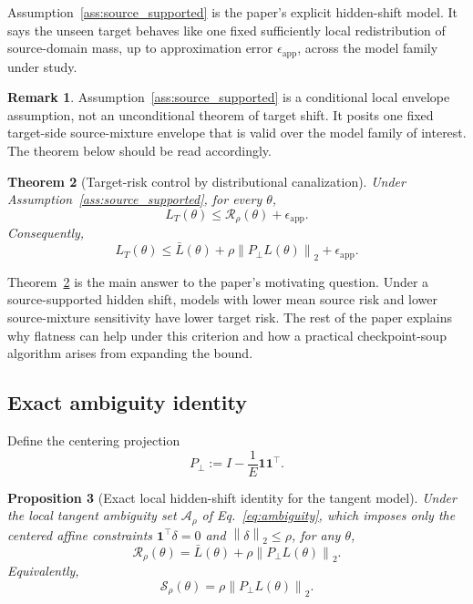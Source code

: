 \documentclass{article}
\newtheorem{theorem}{Theorem}[section]
\newtheorem{proposition}[theorem]{Proposition}
\theoremstyle{definition}
\newtheorem{remark}[theorem]{Remark}
\newcommand{\cA}{\mathcal{A}}
\newcommand{\one}{\mathbf{1}}
\newcommand{\norm}[1]{\left\lVert #1 \right\rVert}
\begin{document}
Assumption~\ref{ass:source_supported} is the paper's explicit hidden-shift model. It says the unseen target behaves like one fixed sufficiently local redistribution of source-domain mass, up to approximation error \(\epsilon_{\mathrm{app}}\), across the model family under study.

\begin{remark}
Assumption~\ref{ass:source_supported} is a conditional local envelope assumption, not an unconditional theorem of target shift. It posits one fixed target-side source-mixture envelope that is valid over the model family of interest. The theorem below should be read accordingly.
\end{remark}

\begin{theorem}[Target-risk control by distributional canalization]
\label{thm:target_control}
Under Assumption~\ref{ass:source_supported}, for every \(\theta\),
\begin{equation}
L_T(\theta)
\le
\mathcal R_\rho(\theta)+\epsilon_{\mathrm{app}}.
\label{eq:target_control_abstract}
\end{equation}
Consequently,
\begin{equation}
L_T(\theta)
\le
\bar L(\theta)+\rho \norm{P_\perp L(\theta)}_2+\epsilon_{\mathrm{app}}.
\label{eq:target_control_explicit}
\end{equation}
\end{theorem}

Theorem~\ref{thm:target_control} is the main answer to the paper's motivating question. Under a source-supported hidden shift, models with lower mean source risk and lower source-mixture sensitivity have lower target risk. The rest of the paper explains why flatness can help under this criterion and how a practical checkpoint-soup algorithm arises from expanding the bound.

\subsection{Exact ambiguity identity}

Define the centering projection
\[
P_\perp := I - \frac{1}{E}\one\one^\top.
\]

\begin{proposition}[Exact local hidden-shift identity for the tangent model]
\label{prop:exact_identity}
Under the local tangent ambiguity set \(\cA_\rho\) of Eq.~\eqref{eq:ambiguity}, which imposes only the centered affine constraints \(\one^\top \delta = 0\) and \(\norm{\delta}_2 \le \rho\), for any \(\theta\),
\begin{equation}
\mathcal R_\rho(\theta)
=
\bar L(\theta) + \rho \norm{P_\perp L(\theta)}_2.
\label{eq:exact_identity}
\end{equation}
Equivalently,
\begin{equation}
\mathcal S_\rho(\theta)=\rho \norm{P_\perp L(\theta)}_2.
\label{eq:exact_sensitivity}
\end{equation}
\end{proposition}
\end{document}
